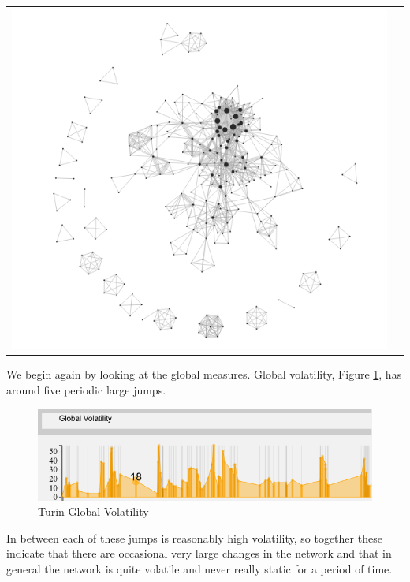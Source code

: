 \begin{center}
\begin{tabular}{cc}
\label{edgeTypes}
\includegraphics[trim={0 0 0 0}, width=140mm]{./Figures/TurinLocalVolatilityFull.png}
\end{tabular}
\label{fig:TurinLocalVolatilityFull}
\end{center}

We begin again by looking at the global measures. Global volatility, Figure \ref{fig:TurinGlobalVolatility}, has around five periodic large jumps.

\begin{figure}[h!]
  \begin{center}
  \includegraphics[trim={0 0 0 0}, width=140mm]{./Figures/TurinGlobalVolatility.png}
  \caption{Turin Global Volatility}
  \label{fig:TurinGlobalVolatility}
  \end{center}
\end{figure}

In between each of these jumps is reasonably high volatility, so together these indicate that there are occasional very large changes in the network and that in general the network is quite volatile and never really static for a period of time.
    
